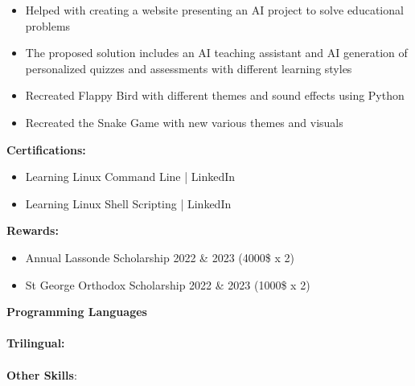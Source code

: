 \documentclass[10pt,a4paper,ragged2e,withhyper]{altacv}
\begin{document}
\begin{paracol}{2}
\begin{itemize}
    \item Helped with creating a website presenting an AI project to solve educational problems
    \item The proposed solution includes an AI teaching assistant and AI generation of personalized quizzes and assessments with different learning styles
\end{itemize}

\begin{itemize}
    \item Recreated Flappy Bird with different themes and sound effects using Python
\end{itemize}

\begin{itemize}
    \item Recreated the Snake Game with new various themes and visuals
\end{itemize}



\textbf{Certifications:}
\begin{itemize}
    \item Learning Linux Command Line | LinkedIn
    \item Learning Linux Shell Scripting | LinkedIn
\end{itemize}

\textbf{Rewards:}
\begin{itemize}
    \item Annual Lassonde Scholarship 2022 \& 2023 (4000\$ x 2) 
    \item St George Orthodox Scholarship 2022 \& 2023 (1000\$ x 2)
\end{itemize}



\textbf{Programming Languages}\\
\divider
\\
\textbf{Trilingual:}
\\
\divider
\\
\textbf{Other Skills}:
\\
\\
\\


\end{paracol}
\end{document}
